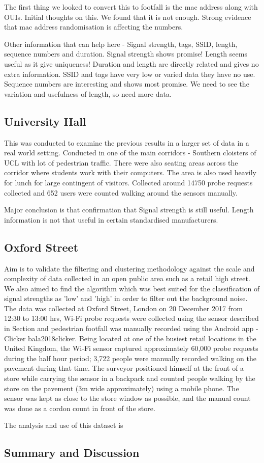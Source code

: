 The first thing we looked to convert this to footfall is the mac address along with OUIs.
Initial thoughts on this.
We found that it is not enough.
Strong evidence that mac address randomisation is affecting the numbers.

Other information that can help here - Signal strength, tags, SSID, length, sequence numbers and duration.
Signal strength shows promise!
Length seems useful as it give uniqueness!
Duration and length are directly related and gives no extra information.
SSID and tags have very low or varied data they have no use.
Sequence numbers are interesting and shows most promise.
We need to see the variation and usefulness of length, so need more data.

\subsection{University Hall}
This was conducted to examine the previous results in a larger set of data in a real world setting.
Conducted in one of the main corridors - Southern cloisters of UCL with lot of pedestrian traffic.
There were also seating areas across the corridor where students work with their computers.
The area is also used heavily for lunch for large contingent of visitors.
Collected around 14750 probe requests collected and 652 users were counted walking around the sensors manually.

Major conclusion is that confirmation that Signal strength is still useful.
Length information is not that useful in certain standardised manufacturers.

\subsection{Oxford Street}

Aim is to validate the filtering and clustering methodology against the scale and complexity of data collected in an open public area such as a retail high street.
We also aimed to find the algorithm which was best suited for the classification of signal strengths as 'low' and 'high' in order to filter out the background noise.
The data was collected at Oxford Street, London on 20 December 2017 from 12:30 to 13:00 hrs, Wi-Fi probe requests were collected using the sensor described in Section and pedestrian footfall was manually recorded using the Android app - Clicker bala2018clicker.
Being located at one of the busiest retail locations in the United Kingdom, the Wi-Fi sensor captured approximately 60,000 probe requests during the half hour period; 3,722 people were manually recorded walking on the pavement during that time.
The surveyor positioned himself at the front of a store while carrying the sensor in a backpack and counted people walking by the store on the pavement (3m wide approximately) using a mobile phone.
The sensor was kept as close to the store window as possible, and the manual count was done as a cordon count in front of the store.

The analysis and use of this dataset is 

\subsection{Summary and Discussion}
